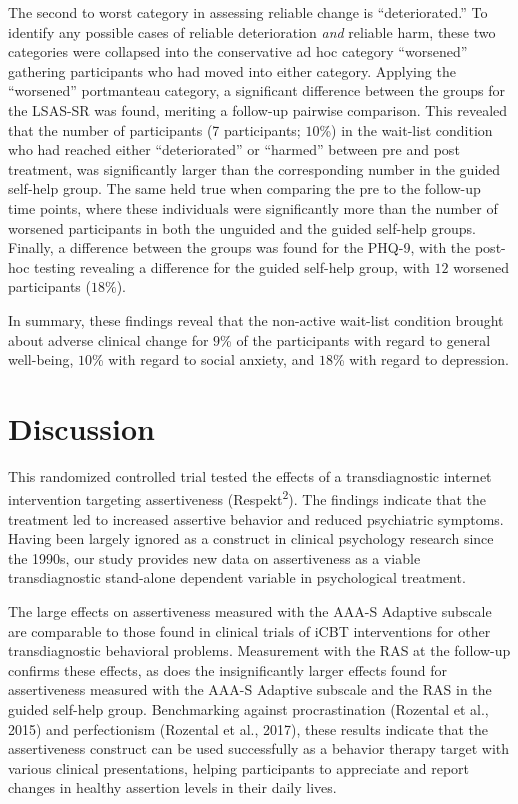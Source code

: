 \documentclass[preprint,
3p]{elsarticle} %
\begin{document}
The second to worst category in assessing reliable change is
``deteriorated.'' To identify any possible cases of reliable
deterioration \emph{and} reliable harm, these two categories were
collapsed into the conservative ad hoc category ``worsened'' gathering
participants who had moved into either category. Applying the
``worsened'' portmanteau category, a significant difference between the
groups for the LSAS-SR was found, meriting a follow-up pairwise
comparison. This revealed that the number of participants (7
participants; \(10\)\%) in the wait-list condition who had reached
either ``deteriorated'' or ``harmed'' between pre and post treatment,
was significantly larger than the corresponding number in the guided
self-help group. The same held true when comparing the pre to the
follow-up time points, where these individuals were significantly more
than the number of worsened participants in both the unguided and the
guided self-help groups. Finally, a difference between the groups was
found for the PHQ-9, with the post-hoc testing revealing a difference
for the guided self-help group, with \(12\) worsened participants
(\(18\)\%).

In summary, these findings reveal that the non-active wait-list
condition brought about adverse clinical change for \(9\)\% of the
participants with regard to general well-being, \(10\)\% with regard to
social anxiety, and \(18\)\% with regard to depression.

\hypertarget{discussion}{%
\section{Discussion}\label{discussion}}

This randomized controlled trial tested the effects of a transdiagnostic
internet intervention targeting assertiveness
(Respekt\textsuperscript{2}). The findings indicate that the treatment
led to increased assertive behavior and reduced psychiatric symptoms.
Having been largely ignored as a construct in clinical psychology
research since the 1990s, our study provides new data on assertiveness
as a viable transdiagnostic stand-alone dependent variable in
psychological treatment.

The large effects on assertiveness measured with the AAA-S Adaptive
subscale are comparable to those found in clinical trials of iCBT
interventions for other transdiagnostic behavioral problems. Measurement
with the RAS at the follow-up confirms these effects, as does the
insignificantly larger effects found for assertiveness measured with the
AAA-S Adaptive subscale and the RAS in the guided self-help group.
Benchmarking against procrastination (Rozental et al., 2015) and
perfectionism (Rozental et al., 2017), these results indicate that the
assertiveness construct can be used successfully as a behavior therapy
target with various clinical presentations, helping participants to
appreciate and report changes in healthy assertion levels in their daily
lives.
\end{document}
